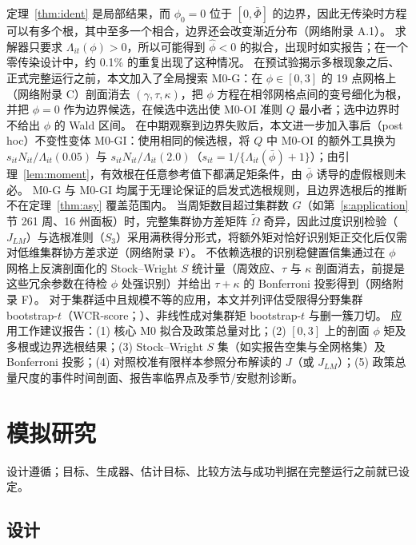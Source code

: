 \documentclass[11pt,a4paper]{ctexart}
\theoremstyle{definition}
\begin{document}
定理~\ref{thm:ident} 是局部结果，而 $\phi_0=0$ 位于 $[0,\bar\Phi]$ 的边界，因此无传染时方程可以有多个根，其中至多一个相合\citep{small2000multiple}，边界还会改变渐近分布（网络附录 A.1）。
求解器只要求 $\Lambda_{it}(\phi)>0$，所以可能得到 $\hat\phi<0$ 的拟合，出现时如实报告；在一个零传染设计中，约 0.1\% 的重复出现了这种情况。
在预试验揭示多根现象之后、正式完整运行之前，本文加入了全局搜索 M0-G：在 $\phi\in[0,3]$ 的 19 点网格上（网络附录 C）剖面消去 $(\gamma,\tau,\kappa)$，把 $\phi$ 方程在相邻网格点间的变号细化为根，并把 $\phi=0$ 作为边界候选，在候选中选出使 M0-OI 准则 $Q$ 最小者\citep{heyde1998multiple}；选中边界时不给出 $\phi$ 的 Wald 区间。
在中期观察到边界失败后，本文进一步加入事后（post hoc）不变性变体 M0-GI：使用相同的候选根，将 $Q$ 中 M0-OI 的额外工具换为 $s_{it}N_{it}/\Lambda_{it}(0.05)$ 与 $s_{it}N_{it}/\Lambda_{it}(2.0)$（$s_{it}=1/\{\Lambda_{it}(\bar\phi)+1\}$）；由引理~\ref{lem:moment}，有效根在任意参考值下都满足矩条件，由 $\bar\phi$ 诱导的虚假根则未必。
M0-G 与 M0-GI 均属于无理论保证的启发式选根规则，且边界选根后的推断不在定理~\ref{thm:asy} 覆盖范围内。
当周矩数目超过集群数 $G$（如第~\ref{s:application} 节 261 周、16 州面板）时，完整集群协方差矩阵 $\tilde\Omega$ 奇异，因此过度识别检验（$J_{LM}$）与选根准则（$S_3$）采用满秩得分形式，将额外矩对恰好识别矩正交化后仅需对低维集群协方差求逆（网络附录 F）。
不依赖选根的识别稳健置信集通过在 $\phi$ 网格上反演剖面化的 Stock--Wright $S$ 统计量\citep{stock2000weak}（周效应、$\tau$ 与 $\kappa$ 剖面消去，前提是这些冗余参数在待检 $\phi$ 处强识别）并给出 $\tau+\kappa$ 的 Bonferroni 投影得到（网络附录 F）。
对于集群适中且规模不等的应用，本文并列评估受限得分野集群 bootstrap-$t$（WCR-score；\citealp{kline2012score}）、非线性成对集群矩 bootstrap-$t$ 与删一簇刀切。
应用工作建议报告：(1) 核心 M0 拟合及政策总量对比；(2) $[0,3]$ 上的剖面 $\phi$ 矩及多根或边界选根结果；(3) Stock--Wright $S$ 集（如实报告空集与全网格集）及 Bonferroni 投影；(4) 对照校准有限样本参照分布解读的 $J$（或 $J_{LM}$）；(5) 政策总量尺度的事件时间剖面、报告率临界点及季节/安慰剂诊断。

\section{模拟研究}
\label{s:simulation}

设计遵循\citet{morris2019ademp}；目标、生成器、估计目标、比较方法与成功判据在完整运行之前就已设定。

\subsection{设计}
\end{document}
